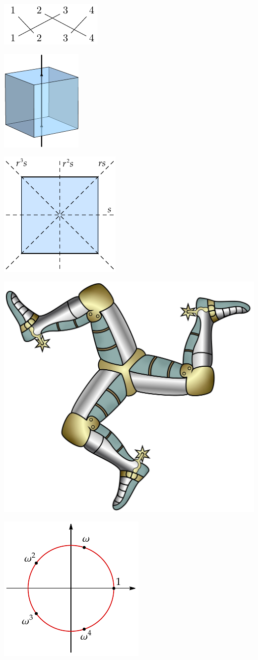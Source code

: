 \documentclass{article}
\begin{document}
\includegraphics{diagram.pdf}

\includegraphics{MyCubeAxis1.pdf}

\includegraphics{SquareSymmetry.pdf}

\includegraphics{Triskelion.jpg}

\includegraphics{FifthRootsOfUnity}
\end{document}
